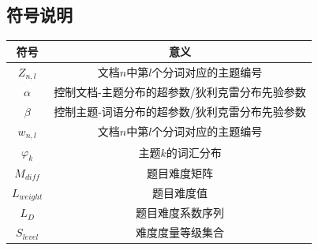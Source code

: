 \subsection{符号说明}

\begin{table}[h]
    \centering
    \begin{tabular}{@{}cc@{}}
        \toprule
        \quad \quad \quad 符号 \quad \quad \quad           & 意义                       \\ \midrule
        $Z_{n,l}$     & 文档$n$中第$l$个分词对应的主题编号     \\
        $\alpha$      & 控制文档-主题分布的超参数/狄利克雷分布先验参数 \\
        $\beta$       & 控制主题-词语分布的超参数/狄利克雷分布先验参数 \\
        $w_{n,l}$     & 文档$n$中第$l$个分词对应的主题编号     \\
        $\varphi_{k}$ & 主题$k$的词汇分布               \\
        $M_{diff}$    & 题目难度矩阵                   \\
        $L_{weight}$  & 题目难度值                    \\
        $L_D$         & 题目难度系数序列                 \\
        $S_{level}$   & 难度度量等级集合                 \\ \bottomrule
    \end{tabular}
\end{table}